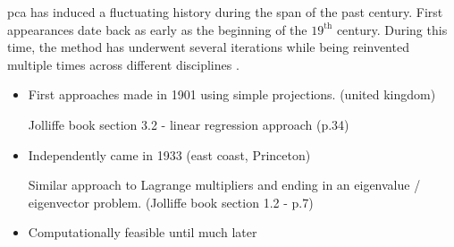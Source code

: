 \Gls{pca} has induced a fluctuating history during the span of the past century.
First appearances date back as early as the beginning of the $19^{\text{th}}$ century. 
During this time, the method has underwent several iterations while being reinvented multiple times across different disciplines \cite{jolliffe2016principal}.


\begin{itemize}
	\item First approaches made in 1901 using simple projections. \cite{pearson1901liii} (united kingdom)

	Jolliffe book section 3.2 - linear regression approach (p.34)
	\item Independently came \cite{hotelling1933analysis} in 1933 (east coast, Princeton) 

	Similar approach to Lagrange multipliers and ending in an eigenvalue / eigenvector problem. (Jolliffe book section 1.2 - p.7)
	\item Computationally feasible until much later

\end{itemize}





